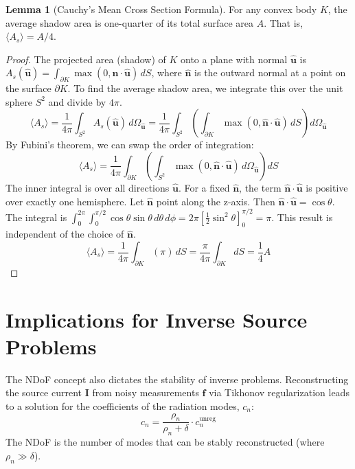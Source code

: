 \documentclass[12pt,a4paper]{article}
\theoremstyle{definition}
\newtheorem{lemma}[theorem]{Lemma}
\newcommand{\vect}[1]{\mathbf{#1}}
\newcommand{\uvect}[1]{\mathbf{\hat{#1}}}
\begin{document}
\begin{lemma}[Cauchy's Mean Cross Section Formula]
For any convex body $K$, the average shadow area is one-quarter of its total surface area $A$. That is, $\langle A_s \rangle = A/4$.
\end{lemma}
\begin{proof}
The projected area (shadow) of $K$ onto a plane with normal $\uvect{u}$ is $A_s(\uvect{u}) = \int_{\partial K} \max(0, \uvect{n} \cdot \uvect{u}) \, dS$, where $\uvect{n}$ is the outward normal at a point on the surface $\partial K$. To find the average shadow area, we integrate this over the unit sphere $S^2$ and divide by $4\pi$.
$$ \langle A_s \rangle = \frac{1}{4\pi} \int_{S^2} A_s(\uvect{u}) \, d\Omega_{\uvect{u}} = \frac{1}{4\pi} \int_{S^2} \left( \int_{\partial K} \max(0, \uvect{n} \cdot \uvect{u}) \, dS \right) d\Omega_{\uvect{u}} $$
By Fubini's theorem, we can swap the order of integration:
$$ \langle A_s \rangle = \frac{1}{4\pi} \int_{\partial K} \left( \int_{S^2} \max(0, \uvect{n} \cdot \uvect{u}) \, d\Omega_{\uvect{u}} \right) dS $$
The inner integral is over all directions $\uvect{u}$. For a fixed $\uvect{n}$, the term $\uvect{n} \cdot \uvect{u}$ is positive over exactly one hemisphere. Let $\uvect{n}$ point along the z-axis. Then $\uvect{n} \cdot \uvect{u} = \cos\theta$. The integral is $\int_0^{2\pi}\int_0^{\pi/2} \cos\theta \sin\theta \, d\theta \, d\phi = 2\pi [ \frac{1}{2}\sin^2\theta ]_0^{\pi/2} = \pi$. This result is independent of the choice of $\uvect{n}$.
$$ \langle A_s \rangle = \frac{1}{4\pi} \int_{\partial K} (\pi) \, dS = \frac{\pi}{4\pi} \int_{\partial K} dS = \frac{1}{4} A $$
\end{proof}

\section{Implications for Inverse Source Problems}
The NDoF concept also dictates the stability of inverse problems. Reconstructing the source current $\vect{I}$ from noisy measurements $\vect{f}$ via Tikhonov regularization leads to a solution for the coefficients of the radiation modes, $c_n$:
$$ c_n = \frac{\rho_n}{\rho_n + \delta} \cdot c_n^{\text{unreg}} $$
The NDoF is the number of modes that can be stably reconstructed (where $\rho_n \gg \delta$).
\end{document}
